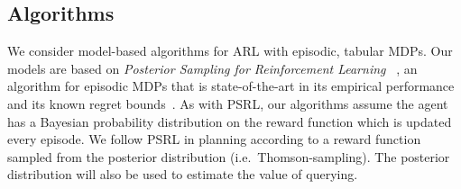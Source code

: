 \documentclass{article}
\begin{document}


\subsection{Algorithms}

We consider model-based algorithms for ARL with episodic, tabular MDPs. Our models are based on \emph{Posterior Sampling for Reinforcement Learning} ~\citep{Strens00}, an algorithm for episodic MDPs that is state-of-the-art in its empirical performance and its known regret bounds~\citep{osband2016posterior}. As with PSRL, our algorithms assume the agent has a Bayesian probability distribution on the reward function which is updated every episode. %
We follow PSRL in planning according to a reward function sampled from the posterior distribution (i.e.\ Thomson-sampling). The posterior distribution will also be used to estimate the value of querying. 
\end{document}

